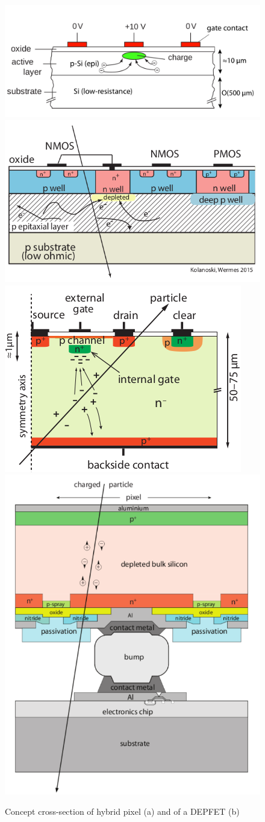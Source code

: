    \begin{figure}
      \centering
      \includegraphics[width=.54\linewidth]{figures/Pixel_detectors/CCD.png}
      \includegraphics[width=.44\linewidth]{figures/Pixel_detectors/MAPS_scheme.png}\\
      \includegraphics[width=.54\linewidth]{figures/Pixel_detectors/DEPFET_scheme.png}
      \includegraphics[width=.44\linewidth]{figures/Pixel_detectors/hybrid_scheme.png}
      \caption{Concept cross-section of hybrid pixel (a) and of a DEPFET (b)}
      \label{fig:hybrid_DEPFET_scheme}
   \end{figure}

